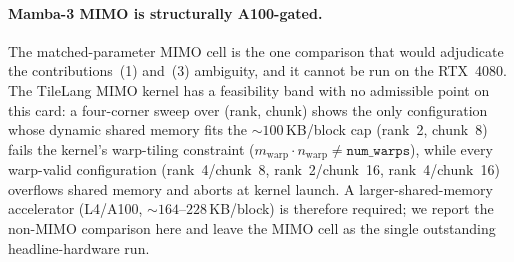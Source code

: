 \paragraph{Mamba-3 MIMO is structurally A100-gated.}
The matched-parameter MIMO cell is the one comparison that would adjudicate the
contributions~(1) and~(3) ambiguity, and it cannot be run on the RTX~4080. The TileLang
MIMO kernel has a feasibility band with no admissible point on this card: a four-corner
sweep over (rank, chunk) shows the only configuration whose dynamic shared memory fits the
$\sim\!100$\,KB/block cap (rank~2, chunk~8) fails the kernel's warp-tiling constraint
($m_{\mathrm{warp}}\cdot n_{\mathrm{warp}} \neq \texttt{num\_warps}$), while every
warp-valid configuration (rank~4/chunk~8, rank~2/chunk~16, rank~4/chunk~16) overflows shared
memory and aborts at kernel launch. A larger-shared-memory accelerator (L4/A100,
$\sim\!164$--$228$\,KB/block) is therefore required; we report the non-MIMO comparison here
and leave the MIMO cell as the single outstanding headline-hardware run.
